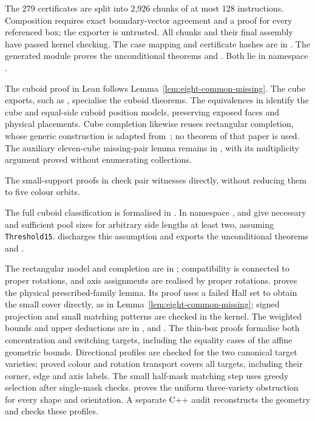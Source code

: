 The 279 certificates are split into 2,926 chunks of at most 128
instructions. Composition requires exact boundary-vector agreement and a
proof for every referenced box; the exporter is untrusted. All chunks and
their final assembly have passed kernel checking. The case mapping and
certificate hashes are in .
The generated module 
proves the unconditional theorems  and
. Both lie in namespace
.

The cuboid proof in Lean follows Lemma~\ref{lem:eight-common-missing}.
The cube exports, such as , specialise the cuboid theorems.
The equivalences in  identify the cube
and equal-side cuboid position models, preserving exposed faces and physical
placements. Cube completion likewise reuses rectangular completion, whose
generic construction is adapted from~\cite{FourToThree}; no theorem of that
paper is used. The auxiliary eleven-cube missing-pair lemma remains in
, with its multiplicity argument proved
without enumerating collections.

The small-support proofs in  check pair
witnesses directly, without reducing them to five colour orbits.

The full cuboid classification is formalised in
. In namespace
,  and
 give necessary and sufficient pool sizes for
arbitrary side lengths at least two, assuming
\texttt{Threshold15}.  discharges this assumption and
exports the unconditional  theorems
 and .

The rectangular model and completion are in
; compatibility is connected to proper
rotations, and axis assignments are realised by proper rotations.
 proves the physical prescribed-family
lemma. Its proof uses a failed Hall set to obtain the small cover directly,
as in Lemma~\ref{lem:eight-common-missing}; signed projection and small matching
patterns are checked in the kernel. The weighted bounds and upper deductions
are in , 
and . The thin-box proofs formalise both
concentration and switching targets, including the equality cases of the
affine geometric bounds. Directional profiles are checked for the two
canonical target varieties; proved colour and rotation transport covers
all targets, including their corner, edge and axis labels. The small
half-mask matching step uses greedy selection after single-mask checks.
 proves the
uniform three-variety obstruction for every shape and orientation.
A separate C++ audit reconstructs the geometry and checks these profiles.

